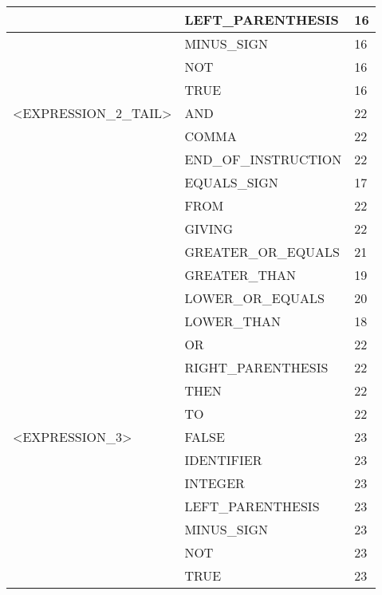 \begin{longtable}{|l|l|l|}
                     &   LEFT\_PARENTHESIS    &   16 \\ \hline
                     &   MINUS\_SIGN          &   16 \\ \hline
                     &   NOT                  &   16 \\ \hline
                     &   TRUE                 &   16 \\ \hline
<EXPRESSION\_2\_TAIL>                     &   AND                  &   22 \\ \hline
                     &   COMMA                &   22 \\ \hline
                     &   END\_OF\_INSTRUCTION &   22 \\ \hline
                     &   EQUALS\_SIGN         &   17 \\ \hline
                     &   FROM                 &   22 \\ \hline
                     &   GIVING               &   22 \\ \hline
                     &   GREATER\_OR\_EQUALS  &   21 \\ \hline
                     &   GREATER\_THAN        &   19 \\ \hline
                     &   LOWER\_OR\_EQUALS    &   20 \\ \hline
                     &   LOWER\_THAN          &   18 \\ \hline
                     &   OR                   &   22 \\ \hline
                     &   RIGHT\_PARENTHESIS   &   22 \\ \hline
                     &   THEN                 &   22 \\ \hline
                     &   TO                   &   22 \\ \hline
<EXPRESSION\_3>                          &   FALSE                &   23 \\ \hline
                     &   IDENTIFIER           &   23 \\ \hline
                     &   INTEGER              &   23 \\ \hline
                     &   LEFT\_PARENTHESIS    &   23 \\ \hline
                     &   MINUS\_SIGN          &   23 \\ \hline
                     &   NOT                  &   23 \\ \hline
                     &   TRUE                 &   23 \\ \hline

\end{longtable}
